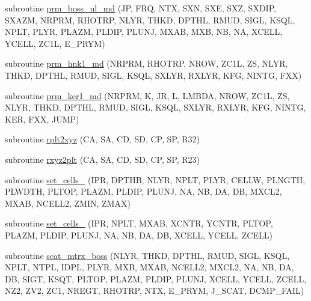 \begin{DoxyCompactItemize}
\item 
subroutine \hyperlink{Leroi__c_8f90_ab6689c64fba851d3db437dbd7fc0d13a}{prm\+\_\+boss\+\_\+ul\+\_\+md} (JP, F\+RQ, N\+TX, S\+XN, S\+XE, S\+XZ, S\+X\+D\+IP, S\+X\+A\+ZM, N\+R\+P\+RM, R\+H\+O\+T\+RP, N\+L\+YR, T\+H\+KD, D\+P\+T\+HL, R\+M\+UD, S\+I\+GL, K\+S\+QL, N\+P\+LT, P\+L\+YR, P\+L\+A\+ZM, P\+L\+D\+IP, P\+L\+U\+NJ, M\+X\+AB, M\+XB, NB, NA, X\+C\+E\+LL, Y\+C\+E\+LL, Z\+C1L, E\+\_\+\+P\+R\+YM)
\item 
subroutine \hyperlink{Leroi__c_8f90_a90b2b96ee9e9153503bfd5d5bf7d1d0e}{prm\+\_\+hnk1\+\_\+md} (N\+R\+P\+RM, R\+H\+O\+T\+RP, N\+R\+OW, Z\+C1L, ZS, N\+L\+YR, T\+H\+KD, D\+P\+T\+HL, R\+M\+UD, S\+I\+GL, K\+S\+QL, S\+X\+L\+YR, R\+X\+L\+YR, K\+FG, N\+I\+N\+TG, F\+XX)
\item 
subroutine \hyperlink{Leroi__c_8f90_a3a9566c86f1c0b93bae5a6117621feae}{prm\+\_\+ker1\+\_\+md} (N\+R\+P\+RM, K, JR, L, L\+M\+B\+DA, N\+R\+OW, Z\+C1L, ZS, N\+L\+YR, T\+H\+KD, D\+P\+T\+HL, R\+M\+UD, S\+I\+GL, K\+S\+QL, S\+X\+L\+YR, R\+X\+L\+YR, K\+FG, N\+I\+N\+TG, K\+ER, F\+XX, J\+U\+MP)
\item 
subroutine \hyperlink{Leroi__c_8f90_a8ec0c93946d1a3d78ce1cabd3de6558d}{rplt2xyz} (CA, SA, CD, SD, CP, SP, R32)
\item 
subroutine \hyperlink{Leroi__c_8f90_af139b1e21e0c1e77a354000840adee66}{rxyz2plt} (CA, SA, CD, SD, CP, SP, R23)
\item 
subroutine \hyperlink{Leroi__c_8f90_a34542cb94b24b37bf99b63f2e3e5e368}{set\+\_\+cells\+\_} (I\+PR, D\+P\+T\+HB, N\+L\+YR, N\+P\+LT, P\+L\+YR, C\+E\+L\+LW, P\+L\+N\+G\+TH, P\+L\+W\+D\+TH, P\+L\+T\+OP, P\+L\+A\+ZM, P\+L\+D\+IP, P\+L\+U\+NJ, NA, NB, DA, DB, M\+X\+C\+L2, M\+X\+AB, N\+C\+E\+L\+L2, Z\+M\+IN, Z\+M\+AX)
\item 
subroutine \hyperlink{Leroi__c_8f90_a14cc0157cbf2d5d8c0af6167028061cf}{set\+\_\+cells\+\_} (I\+PR, N\+P\+LT, M\+X\+AB, X\+C\+N\+TR, Y\+C\+N\+TR, P\+L\+T\+OP, P\+L\+A\+ZM, P\+L\+D\+IP, P\+L\+U\+NJ, NA, NB, DA, DB, X\+C\+E\+LL, Y\+C\+E\+LL, Z\+C\+E\+LL)
\item 
subroutine \hyperlink{Leroi__c_8f90_ace4eaf8c1fdfc5cad3e2a93e77642139}{scat\+\_\+mtrx\+\_\+boss} (N\+L\+YR, T\+H\+KD, D\+P\+T\+HL, R\+M\+UD, S\+I\+GL, K\+S\+QL, N\+P\+LT, N\+T\+PL, I\+D\+PL, P\+L\+YR, M\+XB, M\+X\+AB, N\+C\+E\+L\+L2, M\+X\+C\+L2, NA, NB, DA, DB, S\+I\+GT, K\+S\+QT, P\+L\+T\+OP, P\+L\+A\+ZM, P\+L\+D\+IP, P\+L\+U\+NJ, X\+C\+E\+LL, Y\+C\+E\+LL, Z\+C\+E\+LL, N\+Z2, Z\+V2, Z\+C1, N\+R\+E\+GT, R\+H\+O\+T\+RP, N\+TX, E\+\_\+\+P\+R\+YM, J\+\_\+\+S\+C\+AT, D\+C\+M\+P\+\_\+\+F\+A\+IL)

\end{DoxyCompactItemize}
